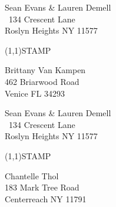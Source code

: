 \documentclass[12pt]{article}
\begin{document}
\begin{minipage}{.5\linewidth} \noindent
Sean Evans \& Lauren Demell\\\ 
134 Crescent Lane\\ 
Roslyn Heights NY 11577
\end{minipage}
\begin{minipage}{.5\linewidth \hspace{-.2in} \vspace{-.3in}}
\begin{flushright}
\framebox(1,1){STAMP}
\end{flushright}
\end{minipage}

\begin{center} \begin{Huge} \vspace*{\fill}
Brittany Van Kampen\\
462 Briarwood Road\\
Venice FL 34293\\
\vspace{\fill} \end{Huge} \end{center}

\clearpage

\begin{minipage}{.5\linewidth} \noindent
Sean Evans \& Lauren Demell\\\ 
134 Crescent Lane\\ 
Roslyn Heights NY 11577
\end{minipage}
\begin{minipage}{.5\linewidth \hspace{-.2in} \vspace{-.3in}}
\begin{flushright}
\framebox(1,1){STAMP}
\end{flushright}
\end{minipage}

\begin{center} \begin{Huge} \vspace*{\fill}
Chantelle Thol\\
183 Mark Tree Road\\
Centerreach NY 11791\\
\vspace{\fill} \end{Huge} \end{center}

\clearpage
\end{document}
